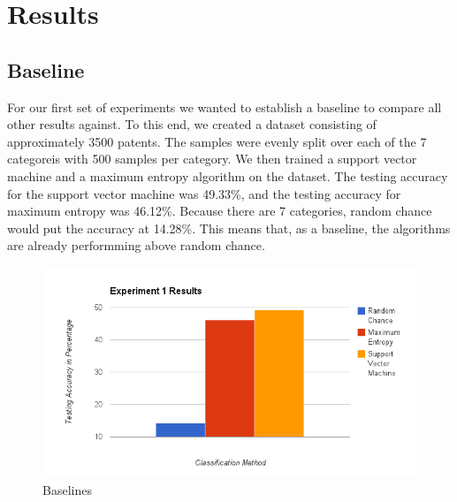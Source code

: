 \section{Results}
\subsection{Baseline}
For our first set of experiments we wanted to establish a baseline to compare all other results against.  To this end, we created a dataset consisting of approximately 3500 patents.  The samples were evenly split over each of the 7 categoreis with 500 samples per category.  We then trained a support vector machine and a maximum entropy algorithm on the dataset.  The testing accuracy for the support vector machine was
49.33\%, and the testing accuracy for maximum entropy was 46.12\%.  Because there are 7 categories, random chance would put the accuracy at 
14.28\%.  This means that, as a baseline, the algorithms are already performming above random chance.

\begin{figure}[H!]
\centering
\includegraphics{Experiment Results 1.png}
\caption{Baselines}
\label{overflow}
\end{figure}

